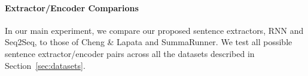 



\paragraph{Extractor/Encoder Comparions}{
In our main experiment, we compare our proposed 
sentence extractors, RNN and Seq2Seq,
to those of Cheng \& Lapata and SummaRunner.
We test all possible sentence extractor/encoder pairs across all the datasets
described in Section~\ref{sec:datasets}.} 









